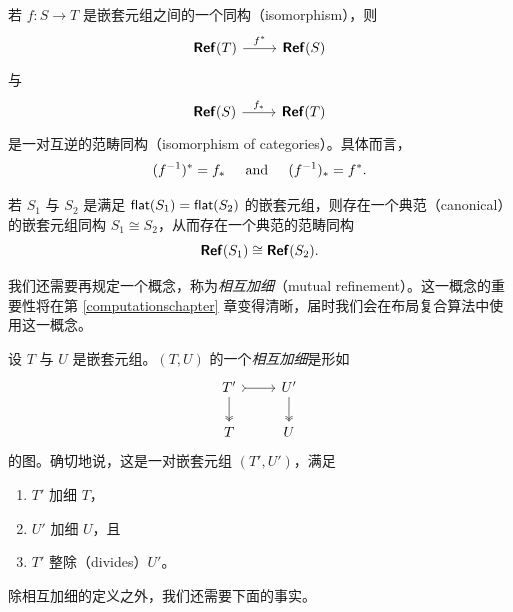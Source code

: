 \begin{observation}
    若 $f:S \to T$ 是嵌套元组之间的一个同构（isomorphism），则
    \[\begin{tikzcd}
        \catstyle{Ref}(T) \ar[r,"f^*"] & \catstyle{Ref}(S)
    \end{tikzcd}
    \]
    与
    \[\begin{tikzcd}
        \catstyle{Ref}(S) \ar[r,"f_*"] & \catstyle{Ref}(T)
    \end{tikzcd}
    \]
    是一对互逆的范畴同构（isomorphism of categories）。具体而言，
    \[
    (f^{-1})^* = f_* \hspace{0.2in} \text{and} \hspace{0.2in} (f^{-1})_* = f^*.
    \]
\end{observation}

\begin{observation}
    若 $S_1$ 与 $S_2$ 是满足 $\mathsf{flat}(S_1) = \mathsf{flat}(S_2)$ 的嵌套元组，则存在一个典范（canonical）的嵌套元组同构 $S_1 \cong S_2$，从而存在一个典范的范畴同构
    \[
    {\boldsymbol{\mathsf{Ref}}}(S_1) \cong {\boldsymbol{\mathsf{Ref}}}(S_2).
    \]
\end{observation}

我们还需要再规定一个概念，称为{\it 相互加细}（mutual refinement）。这一概念的重要性将在第 \ref{computationschapter} 章变得清晰，届时我们会在布局复合算法中使用这一概念。

\begin{definition}
设 $T$ 与 $U$ 是嵌套元组。$(T,U)$ 的一个{\it 相互加细}是形如
\[ \begin{tikzcd}
T' \ar[r,rightarrowtail] \ar[d, two heads] & U' \ar[d,two heads] \\
T & U
\end{tikzcd} \]
的图。确切地说，这是一对嵌套元组 $(T',U')$，满足\begin{enumerate}
    \item $T'$ 加细 $T$，
    \item $U'$ 加细 $U$，且
    \item $T'$ 整除（divides）$U'$。
\end{enumerate}
\end{definition}

除相互加细的定义之外，我们还需要下面的事实。

